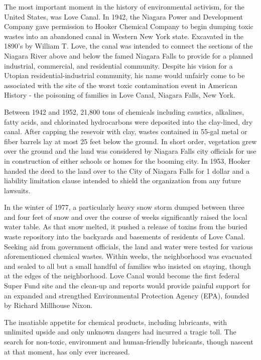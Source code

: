 The most important moment in the history of environmental activism, for the United States, was Love Canal. In 1942, the Niagara Power and Development Company gave permission to Hooker Chemical Company to begin dumping toxic wastes into an abandoned canal in Western New York state. Excavated in the 1890's by William T. Love, the canal was intended to connect the sections of the Niagara River above and below the famed Niagara Falls to provide for a planned industrial, commercial, and residential community. Despite his vision for a Utopian residential-industrial community, his name would unfairly come to be associated with the site of the worst toxic contamination event in American History - the poisoning of families in Love Canal, Niagara Falls, New York.

Between 1942 and 1952, 21,800 tons of chemicals including caustics, alkalines, fatty acids, and chlorinated hydrocarbons were deposited into the clay-lined, dry canal. After capping the resevoir with clay, wastes contained in 55-gal metal or fiber barrels lay at most 25 feet below the ground. In short order, vegetation grew over the ground and the land was considered by Niagara Falls city officials for use in construction of either schools or homes for the booming city. In 1953, Hooker handed the deed to the land over to the City of Niagara Falls for 1 dollar and a liability limitation clause intended to shield the organization from any future lawsuits.

In the winter of 1977, a particularly heavy snow storm dumped between three and four feet of snow and over the course of weeks significantly raised the local water table. As that snow melted, it pushed a release of toxins from the buried waste repository into the backyards and basements of residents of Love Canal. Seeking aid from government officials, the land and water were tested for various aforementioned chemical wastes. Within weeks, the neighborhood was evacuated and sealed to all but a small handful of families who insisted on staying, though at the edges of the neighborhood. Love Canal would become the first federal Super Fund site and the clean-up and reports would provide painful support for an expanded and strengthed Environmental Protection Agency (EPA), founded by Richard Millhouse Nixon. 

The insatiable appetite for chemical products, including lubricants, with unlimited upside and only unknown dangers had incurred a tragic toll. The search for non-toxic, environment and human-friendly lubricants, though nascent at that moment, has only ever increased.

